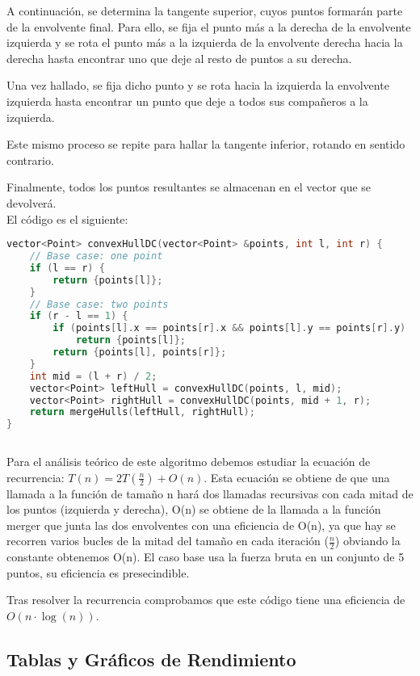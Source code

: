\documentclass[a4paper,12pt]{article}
\begin{document}
A continuación, se determina la tangente superior, cuyos puntos formarán parte de la envolvente final. 
Para ello, se fija el punto más a la derecha de la envolvente izquierda y se rota el punto más a la izquierda 
de la envolvente derecha hacia la derecha hasta encontrar uno que deje al resto de puntos a su derecha. 

Una vez hallado, se fija dicho punto y se rota hacia la izquierda la envolvente izquierda hasta encontrar un punto 
que deje a todos sus compañeros a la izquierda. 

Este mismo proceso se repite para hallar la tangente inferior, rotando en sentido contrario. 

Finalmente, todos los puntos resultantes se almacenan en el vector que se devolverá.\\

El código es el siguiente:

\begin{lstlisting}[language=C++, caption={Divide y vencerás de \textbf{``La envolvente convexa''}}]
vector<Point> convexHullDC(vector<Point> &points, int l, int r) {
	// Base case: one point
	if (l == r) {
		return {points[l]};
	}
	// Base case: two points
	if (r - l == 1) {
		if (points[l].x == points[r].x && points[l].y == points[r].y)
			return {points[l]};
		return {points[l], points[r]};
	}
	int mid = (l + r) / 2;
	vector<Point> leftHull = convexHullDC(points, l, mid);
	vector<Point> rightHull = convexHullDC(points, mid + 1, r);
	return mergeHulls(leftHull, rightHull);
}
	
\end{lstlisting}

Para el análisis teórico de este algoritmo debemos estudiar la ecuación de recurrencia: $T(n) = 2T(\frac{n}{2}) + O(n)$.
Esta ecuación se obtiene de que una llamada a la función de tamaño n hará dos llamadas recursivas con cada mitad de los puntos (izquierda y derecha),
O(n) se obtiene de la llamada a la función merger que junta las dos envolventes con una eficiencia de O(n), ya que
hay se recorren varios bucles de la mitad del tamaño en cada iteración ($\frac{n}{2}$) obviando la constante obtenemos O(n).
El caso base usa la fuerza bruta en un conjunto de 5 puntos, su eficiencia es presecindible.

Tras resolver la recurrencia comprobamos que este código tiene una eficiencia de $O(n\cdot \log (n))$.

\subsection{Tablas y Gráficos de Rendimiento}
\end{document}

